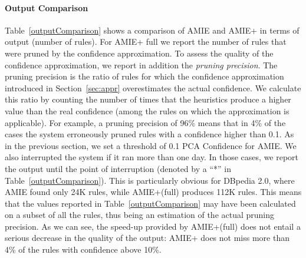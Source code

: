 \paragraph{Output Comparison}
Table~\ref{outputComparison} shows a comparison of AMIE and AMIE+ in terms of output (number of rules).
For AMIE+ full we report the number of rules that were pruned by the confidence approximation.
To assess the quality of the confidence approximation, we report in addition the \emph{pruning precision}.
The pruning precision is the ratio of rules for which the confidence approximation introduced
in Section~\ref{sec:appr} overestimates the actual confidence. We
calculate this ratio by counting the number of times that the heuristics
produce a higher value than the real confidence (among the rules on which the approximation is applicable). 
For example, a pruning precision of 96\% means
that in 4\% of the cases the system erroneously pruned rules with a confidence higher than 0.1.
As in the previous section, we set a threshold of 0.1 PCA Confidence for AMIE. We also interrupted the system 
if it ran more than one day. In those cases, we report the output until the point of interruption (denoted by a ``*'' in Table~\ref{outputComparison}).
This is particularly obvious for DBpedia 2.0, where AMIE found only 24K rules, while AMIE+(full) produces 112K rules.
This means that the values reported in Table~\ref{outputComparison}
may have been calculated on a
subset of all the rules, thus being an estimation of the actual pruning precision. 
As we can see, the speed-up provided by AMIE+(full) does not entail a serious decrease in the quality of the output: 
AMIE+ does not miss more than 4\% of the rules with confidence above 10\%.  



